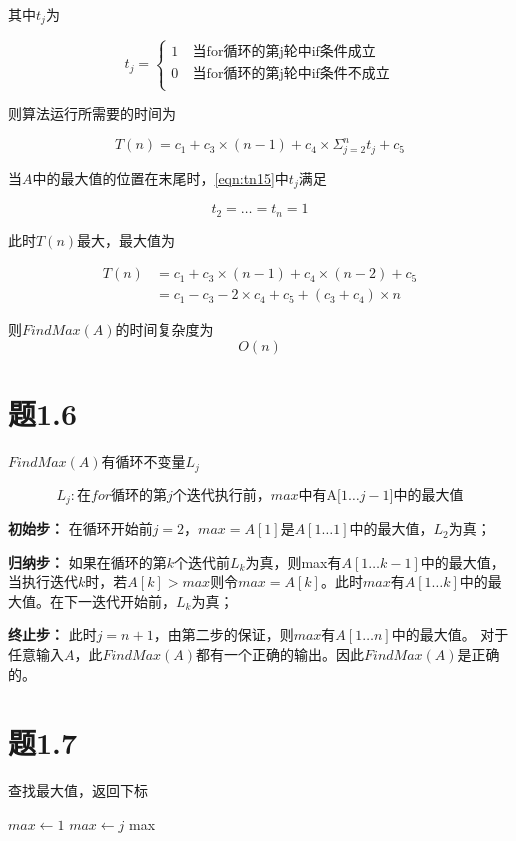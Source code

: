 \documentclass[a4paper,twoside]{article}
\begin{document}
\begin{spacing}{1.2}
其中$t_j$为

$$ t_j=\left\{
\begin{aligned}
	1 & \  \mbox{当for循环的第j轮中if条件成立} \\
	0 & \  \mbox{当for循环的第j轮中if条件不成立} \\
\end{aligned}
\right.
$$

则算法运行所需要的时间为

\begin{equation}
T(n)=c_1 + c_3 \times (n-1) + c_4 \times \Sigma_{j=2}^{n}t_j + c_5 \label{eqn:tn15}
\end{equation}

当$A$中的最大值的位置在末尾时，\eqref{eqn:tn15}中$t_j$满足

$$
t_2=\dots=t_n=1
$$

此时$T(n)$最大，最大值为

\begin{align*}
T(n) & =c_1 + c_3 \times (n-1) + c_4 \times (n-2) + c_5 \\
& = c_1 - c_3 - 2 \times c_4 +c_5 + (c_3+c_4) \times n  
\end{align*}

则$FindMax(A)$的时间复杂度为
$$
O(n)
$$

\section{题1.6}

$FindMax(A)$有循环不变量$L_j$

$$
L_j: \mbox{在$for$循环的第$j$个迭代执行前，$max$中有A[$1 \dots j-1$]中的最大值}
$$

\textbf{初始步：} 在循环开始前$j=2$，$max=A[1]$是$A[1 \dots 1]$中的最大值，$L_2$为真；

\textbf{归纳步：} 如果在循环的第$k$个迭代前$L_{k}$为真，则max有$A[1 \dots k-1]$中的最大值，当执行迭代$k$时，若$A[k] > max$则令$max=A[k]$。此时$max$有$A[1 \dots k]$中的最大值。在下一迭代开始前，$L_k$为真；

\textbf{终止步：} 此时$j=n+1$，由第二步的保证，则$max$有$A[1 \dots n]$中的最大值。
对于任意输入$A$，此$FindMax(A)$都有一个正确的输出。因此$FindMax(A)$是正确的。

\section{题1.7}

\begin{algorithm}
	\caption{查找最大值，返回下标}
	\begin{algorithmic}[1]
		\State $max \gets 1$
		\State $max \gets j$
		\EndIf
		\EndFor
		\Return max
		\EndProcedure
		

\end{algorithmic}
\end{algorithm}
\end{spacing}
\end{document}
